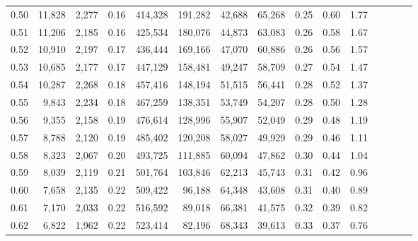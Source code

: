 \begin{tabular}{rrrcrrrrrrrrrrr}
0.50 &  11,828 &  2,277 &                                       0.16 &  414,328 &  191,282 &   42,688 &   65,268 &  0.25 &  0.60 &                         1.77 \\
0.51 &  11,206 &  2,185 &                                       0.16 &  425,534 &  180,076 &   44,873 &   63,083 &  0.26 &  0.58 &                         1.67 \\
0.52 &  10,910 &  2,197 &                                       0.17 &  436,444 &  169,166 &   47,070 &   60,886 &  0.26 &  0.56 &                         1.57 \\
0.53 &  10,685 &  2,177 &                                       0.17 &  447,129 &  158,481 &   49,247 &   58,709 &  0.27 &  0.54 &                         1.47 \\
0.54 &  10,287 &  2,268 &                                       0.18 &  457,416 &  148,194 &   51,515 &   56,441 &  0.28 &  0.52 &                         1.37 \\
0.55 &   9,843 &  2,234 &                                       0.18 &  467,259 &  138,351 &   53,749 &   54,207 &  0.28 &  0.50 &                         1.28 \\
0.56 &   9,355 &  2,158 &                                       0.19 &  476,614 &  128,996 &   55,907 &   52,049 &  0.29 &  0.48 &                         1.19 \\
0.57 &   8,788 &  2,120 &                                       0.19 &  485,402 &  120,208 &   58,027 &   49,929 &  0.29 &  0.46 &                         1.11 \\
0.58 &   8,323 &  2,067 &                                       0.20 &  493,725 &  111,885 &   60,094 &   47,862 &  0.30 &  0.44 &                         1.04 \\
0.59 &   8,039 &  2,119 &                                       0.21 &  501,764 &  103,846 &   62,213 &   45,743 &  0.31 &  0.42 &                         0.96 \\
0.60 &   7,658 &  2,135 &                                       0.22 &  509,422 &   96,188 &   64,348 &   43,608 &  0.31 &  0.40 &                         0.89 \\
0.61 &   7,170 &  2,033 &                                       0.22 &  516,592 &   89,018 &   66,381 &   41,575 &  0.32 &  0.39 &                         0.82 \\
0.62 &   6,822 &  1,962 &                                       0.22 &  523,414 &   82,196 &   68,343 &   39,613 &  0.33 &  0.37 &                         0.76 \\

\end{tabular}
